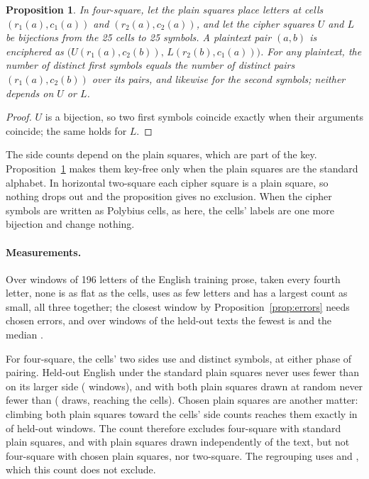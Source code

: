 \documentclass[11pt]{article}
\newtheorem{proposition}{Proposition}
\theoremstyle{definition}
\begin{document}
\begin{proposition}\label{prop:foursquare}
In four-square, let the plain squares place letters at cells $(r_1(a), c_1(a))$ and $(r_2(a), c_2(a))$, and let the cipher squares $U$ and $L$ be bijections from the 25 cells to 25 symbols. A plaintext pair $(a, b)$ is enciphered as $\bigl(U(r_1(a), c_2(b)),\, L(r_2(b), c_1(a))\bigr)$. For any plaintext, the number of distinct first symbols equals the number of distinct pairs $(r_1(a), c_2(b))$ over its pairs, and likewise for the second symbols; neither depends on $U$ or $L$.
\end{proposition}

\begin{proof}
$U$ is a bijection, so two first symbols coincide exactly when their arguments coincide; the same holds for $L$.
\end{proof}

The side counts depend on the plain squares, which are part of the key. Proposition~\ref{prop:foursquare} makes them key-free only when the plain squares are the standard alphabet. In horizontal two-square each cipher square is a plain square, so nothing drops out and the proposition gives no exclusion. When the cipher symbols are written as Polybius cells, as here, the cells' labels are one more bijection and change nothing.

\paragraph{Measurements.} Over \corpusWindows{} windows of 196 letters of the English training prose, taken every fourth letter, none is as flat as the cells, uses as few letters and has a largest count as small, all three together; the closest window by Proposition~\ref{prop:errors} needs \corpusClosestDistance{} chosen errors, and over \errWindows{} windows of the held-out texts the fewest is \errBestFewest{} and the median \errBestMedian{}.

For four-square, the cells' two sides use \fsCellsLow{} and \fsCellsHigh{} distinct symbols, at either phase of pairing. Held-out English under the standard plain squares never uses fewer than \fsStandardFewest{} on its larger side (\fsStandardWindows{} windows), and with both plain squares drawn at random never fewer than \fsKeyedFewest{} (\fsKeyedDraws{} draws, \fsKeyedReaching{} reaching the cells). Chosen plain squares are another matter: climbing both plain squares toward the cells' side counts reaches them exactly in \fskReaching{} of \fskWindows{} held-out windows. The count therefore excludes four-square with standard plain squares, and with plain squares drawn independently of the text, but not four-square with chosen plain squares, nor two-square. The regrouping uses \fsRegroupedA{} and \fsRegroupedB{}, which this count does not exclude.
\end{document}
